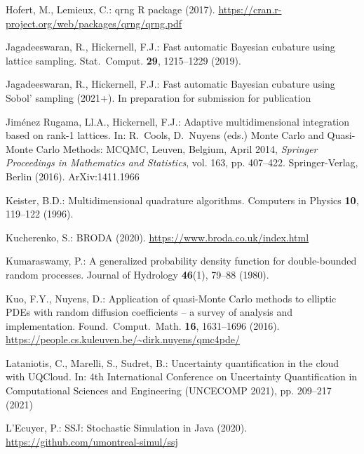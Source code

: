 \documentclass[graybox]{svmult}
\begin{document}
\begin{thebibliography}{10}
Hofert, M., Lemieux, C.: qrng {R} package (2017).
\newblock \urlprefix\url{https://cran.r-project.org/web/packages/qrng/qrng.pdf}

Jagadeeswaran, R., Hickernell, F.J.: Fast automatic {B}ayesian cubature
  using lattice sampling.
\newblock Stat.\ Comput. \textbf{29}, 1215--1229 (2019).
\newblock {}

Jagadeeswaran, R., Hickernell, F.J.: Fast automatic {B}ayesian cubature
  using {S}obol' sampling (2021+).
\newblock In preparation for submission for publication

{Jim\'enez Rugama}, {\relax Ll}.A., Hickernell, F.J.: Adaptive
  multidimensional integration based on rank-1 lattices.
\newblock In: R.~Cools, D.~Nuyens (eds.) {M}onte {C}arlo and Quasi-{M}onte
  {C}arlo Methods: {MCQMC}, {L}euven, {B}elgium, {A}pril 2014, \emph{Springer
  Proceedings in Mathematics and Statistics}, vol. 163, pp. 407--422.
  Springer-Verlag, Berlin (2016).
\newblock ArXiv:1411.1966

Keister, B.D.: Multidimensional quadrature algorithms.
\newblock Computers in Physics \textbf{10}, 119--122 (1996).
\newblock {}

Kucherenko, S.: {BRODA} (2020).
\newblock \urlprefix\url{https://www.broda.co.uk/index.html}

{Kumaraswamy}, P.: {A generalized probability density function for
  double-bounded random processes}.
\newblock Journal of Hydrology \textbf{46}(1), 79--88 (1980).
\newblock {}

Kuo, F.Y., Nuyens, D.: Application of quasi-{M}onte {C}arlo methods to elliptic
  {PDE}s with random diffusion coefficients -- a survey of analysis and
  implementation.
\newblock Found.\ Comput.\ Math. \textbf{16}, 1631--1696 (2016).
\newblock \urlprefix\url{https://people.cs.kuleuven.be/~dirk.nuyens/qmc4pde/}

Lataniotis, C., Marelli, S., Sudret, B.: Uncertainty quantification in the
  cloud with {UQCloud}.
\newblock In: 4th International Conference on Uncertainty Quantification in
  Computational Sciences and Engineering (UNCECOMP 2021), pp. 209--217 (2021)

L'Ecuyer, P.: {SSJ: Stochastic Simulation in Java} (2020).
\newblock \urlprefix\url{https://github.com/umontreal-simul/ssj}


\end{thebibliography}
\end{document}
